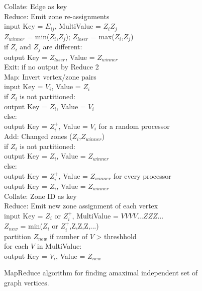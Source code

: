 \begin{figure}[htb]
\begin{center}
{\begin{minipage}{\textwidth}
\begin{tabbing}
 Collate: \> Edge as key \\
 Reduce: \> Emit zone re-assignments \\
       \> \> \> input Key = $E_{ij}$, MultiValue = $Z_i Z_j$ \\
       \> \> \> $Z_{winner}$ = min($Z_i$,$Z_j$); $Z_{loser}$ = max($Z_i$,$Z_j$) \\
       \> \> \> if $Z_i$ and $Z_j$ are different: \\
      \> \> \> \> output Key = $Z_{loser}$, Value = $Z_{winner}$ \\
 Exit: \> if no output by Reduce 2 \\
 Map: \> Invert vertex/zone pairs \\
    \> \> \> input Key = $V_i$, Value = $Z_i$ \\
    \> \> \> if $Z_i$ is not partitioned: \\
   \> \> \> \> output Key = $Z_i$, Value = $V_i$ \\
    \> \> \> else: \\
   \> \> \> \> output Key = $Z_i^+$, Value = $V_i$ for a random processor \\
 Add: \> Changed zones ($Z_i$,$Z_{winner}$) \\
    \> \> \> if $Z_i$ is not partitioned: \\
   \> \> \> \> output Key = $Z_i$, Value = $Z_{winner}$ \\
    \> \> \> else: \\
   \> \> \> \> output Key = $Z_i^+$, Value = $Z_{winner}$ for every processor \\
   \> \> \> \> output Key = $Z_i$, Value = $Z_{winner}$ \\
 Collate: \> Zone ID as key \\
 Reduce: \> Emit new zone assignment of each vertex \\
       \> \> \> input Key = $Z_i$ or $Z_i^+$, MultiValue = $V V V V ... Z Z Z ...$ \\
       \> \> \> $Z_{new}$ = min($Z_i$ or $Z_i^+$,Z,Z,Z,...) \\
       \> \> \> partition $Z_{new}$ if number of $V$ > threshhold \\
       \> \> \> for each $V$ in MultiValue: \\
      \> \> \> \> output Key = $V_i$, Value = $Z_{new}$

  \end{tabbing}
 \end{minipage}}\end{center}

 \caption{MapReduce algorithm for finding amaximal independent set of
 graph vertices.}

 \label{fig:luby}
\end{figure}






